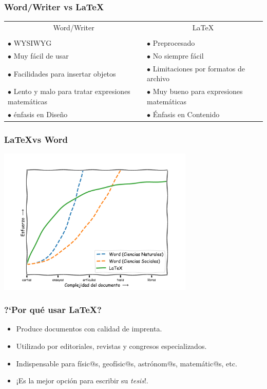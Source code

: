 \documentclass[colorlinks,aspectratio=169]{beamer}
\begin{document}
\begin{frame}[fragile]\frametitle{Word/Writer vs \LaTeX}
\begin{center}
\begin{tabular}{p{}p{}}
\multicolumn{1}{c}{Word/Writer	}     & \multicolumn{1}{c}{\LaTeX}      \\
\\

$\bullet$ WYSIWYG            & $\bullet$ Preprocesado          \\
$\bullet$ Muy fácil de usar & $\bullet$ No siempre fácil     \\
$\bullet$ Facilidades para insertar objetos 
                             & $\bullet$ Limitaciones por formatos de archivo \\[1ex]
$\bullet$ Lento y malo para tratar expresiones matemáticas
                             & $\bullet$ Muy bueno para expresiones matemáticas \\
$\bullet$ énfasis en Dise\~no & $\bullet$ Énfasis en Contenido         
\end{tabular}
\end{center}
\end{frame}

\begin{frame}[fragile]\frametitle{\LaTeX vs Word}
\begin{center}
	\includegraphics[height=7cm]{figs/LaTeX_vs_Word-2.pdf}
\end{center}
\end{frame}

\begin{frame}[fragile]\frametitle{?`Por qué usar \LaTeX?}
\begin{itemize}
\item Produce documentos con calidad de imprenta.
\item Utilizado por editoriales, revistas y congresos especializados.
\item Indispensable para físic@s, geofísic@s, astrónom@s, matemátic@s, etc.
\item ¡Es la mejor opción para escribir su \emph{tesis}!.
\end{itemize}
\end{frame}
\end{document}
